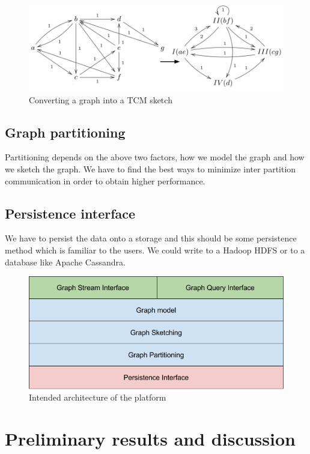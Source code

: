 \documentclass[12pt]{article}
\begin{document}
\begin{figure}[H]
\centering
\includegraphics[scale=0.3]{graph-sketching.png}
\caption{Converting a graph into a TCM sketch}
\label{fig:graph-sketching}
\end{figure}

\subsection{Graph partitioning}
Partitioning depends on the above two factors, how we model the graph and how we sketch the graph. We have to find the best ways to minimize inter partition communication in order to obtain higher performance.

\subsection{Persistence interface}
We have to persist the data onto a storage and this should  be some persistence method which is familiar to the users. We could write to a Hadoop HDFS or to a database like Apache Cassandra.

\begin{figure}
\centering
\includegraphics[scale=0.5]{intended-architecture.png}
\caption{Intended architecture of the platform}
\label{fig:web-graph}
\end{figure}

\clearpage 
\section{Preliminary results and discussion}
\end{document}
